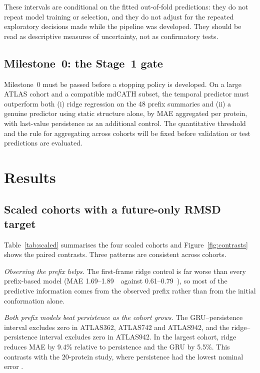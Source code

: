 \documentclass[11pt]{article}
\newcommand{\A}{\text{\AA}}
\begin{document}
These intervals are conditional on the fitted out-of-fold predictions: they do not repeat model training or selection, and they do not adjust for the repeated exploratory decisions made while the pipeline was developed. They should be read as descriptive measures of uncertainty, not as confirmatory tests.

\subsection{Milestone~0: the Stage~1 gate}

Milestone~0 must be passed before a stopping policy is developed. On a large ATLAS cohort and a compatible mdCATH subset, the temporal predictor must outperform both (i) ridge regression on the 48 prefix summaries and (ii) a genuine predictor using static structure alone, by MAE aggregated per protein, with last-value persistence as an additional control. The quantitative threshold and the rule for aggregating across cohorts will be fixed before validation or test predictions are evaluated.

\section{Results}\label{sec:results}

\subsection{Scaled cohorts with a future-only RMSD target}\label{sec:scaled}

Table~\ref{tab:scaled} summarises the four scaled cohorts and Figure~\ref{fig:contrasts} shows the paired contrasts. Three patterns are consistent across cohorts.

\emph{Observing the prefix helps.} The first-frame ridge control is far worse than every prefix-based model (MAE 1.69--1.89~\A\ against 0.61--0.79~\A), so most of the predictive information comes from the observed prefix rather than from the initial conformation alone.

\emph{Both prefix models beat persistence as the cohort grows.} The GRU--persistence interval excludes zero in ATLAS362, ATLAS742 and ATLAS942, and the ridge--persistence interval excludes zero in ATLAS942. In the largest cohort, ridge reduces MAE by 9.4\% relative to persistence and the GRU by 5.5\%. This contrasts with the 20-protein study, where persistence had the lowest nominal error \cite{HernandoGallego2026Mathematics}.
\end{document}
